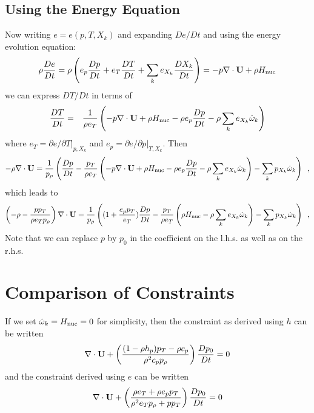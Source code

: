 \subsection{Using the Energy Equation}

Now writing $e = e(p,T,X_k)$ and expanding $De/Dt$ and using the
energy evolution equation:
\begin{equation}
\rho \frac{D e}{Dt}  = \rho \left( e_p \frac{D p}{Dt} + e_T \frac{D T}{Dt} + \sum_k e_{X_k} \frac{D X_k}{Dt} \right)
                     = -p \nabla \cdot {\bf U} + \rho {H_{\rm nuc}}
\end{equation}
we can express $DT/Dt$ in terms of 
\begin{eqnarray*}
\frac{DT}{Dt} &=& \frac{1}{\rho e_T} \left(
                  -p \nabla \cdot {\bf U} + \rho {H_{\rm nuc}}
                 - \rho e_p \frac{D p}{Dt}
                 - \rho \sum_k e_{X_k} \dot{\omega}_k   \right)
\end{eqnarray*}
where $e_T = \left.\partial e/\partial T\right|_{p,X_k}$ 
and $e_p = \left.\partial e/\partial p\right|_{T,X_k}.$
Then
\begin{equation}
-\rho \nabla \cdot {\bf U} = 
    \frac{1}{p_\rho} \left( \frac{D p}{Dt} 
    - \frac{p_T}{\rho e_T} \left(
                 -p \nabla \cdot {\bf U} + \rho {H_{\rm nuc}}
                 - \rho e_p \frac{D p}{Dt}
                 - \rho \sum_k e_{X_k} \dot{\omega}_k   \right)
    - \sum_k p_{X_k} {\dot{\omega}}_k \right) \enskip ,
\end{equation}
which leads to 
\begin{equation}
\left(-\rho -  \frac{p p_T}{\rho e_T p_\rho} \right) \nabla \cdot {\bf U} = 
    \frac{1}{p_\rho} \left( (1 + \frac{e_p p_T}{e_T}) \frac{D p}{Dt} 
                           - \frac{p_T}{\rho e_T} \left(
                                        \rho {H_{\rm nuc}}
                                        - \rho \sum_k e_{X_k} \dot{\omega}_k   \right)
    - \sum_k p_{X_k} {\dot{\omega}}_k \right) \enskip ,
\end{equation}
Note that we can replace $p$ by $p_0$ in the coefficient on the
l.h.s. as well as on the r.h.s.


\section{Comparison of Constraints}

If we set $\dot{\omega}_k = {H_{\rm nuc}} = 0$ for simplicity, then the
constraint as derived using $h$ can be written
\begin{equation}
\nabla \cdot {\bf U}
+ \left( \frac{(1 - \rho h_p )p_T - \rho c_p}{\rho^2
  c_p p_\rho} \right) \frac{D p_0}{D t} = 0
\end{equation}
and the constraint derived using $e$ can be written
\begin{equation}
\nabla \cdot {\bf U} 
+ \left( \frac{\rho e_T + \rho e_p p_T}{\rho^2 e_T p_\rho + p p_T} \right) \frac{D p_0}{D t} = 0
\end{equation}

